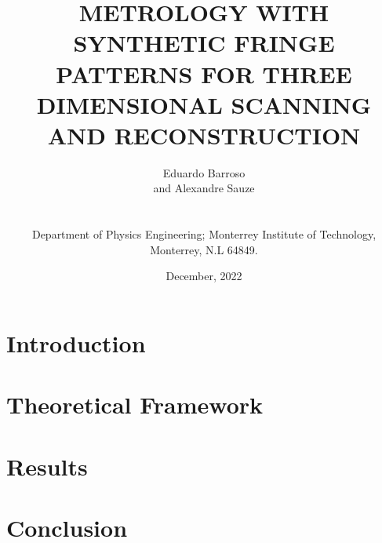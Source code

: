 \documentclass{document_layout}
\title{METROLOGY WITH SYNTHETIC FRINGE PATTERNS FOR THREE DIMENSIONAL SCANNING AND RECONSTRUCTION}
\author{
    Eduardo Barroso \address{1} and Alexandre Sauze \address{1} \\[0.3em]
    {\scriptsize
        \address{1} Department of Physics Engineering; Monterrey Institute of Technology, Monterrey, N.L 64849.\\
    }
}
\date{December, 2022}
\begin{document}
\maketitle

\section{Introduction}


\section{Theoretical Framework}


\section{Results}


\section{Conclusion}



\printbibliography
\end{document}
